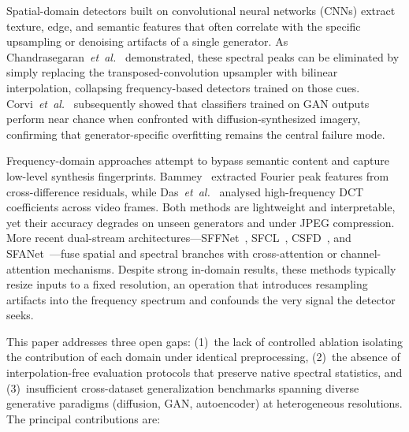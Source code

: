 \documentclass[conference]{IEEEtran}
\begin{document}
Spatial-domain detectors built on convolutional neural networks (CNNs) extract texture, edge, and semantic features that often correlate with the specific upsampling or denoising artifacts of a single generator. As Chandrasegaran~\emph{et~al.}~\cite{chandrasegaran2021fourier} demonstrated, these spectral peaks can be eliminated by simply replacing the transposed-convolution upsampler with bilinear interpolation, collapsing frequency-based detectors trained on those cues. Corvi~\emph{et~al.}~\cite{corvi2023intriguing} subsequently showed that classifiers trained on GAN outputs perform near chance when confronted with diffusion-synthesized imagery, confirming that generator-specific overfitting remains the central failure mode.

Frequency-domain approaches attempt to bypass semantic content and capture low-level synthesis fingerprints. Bammey~\cite{bammey2023synthbuster} extracted Fourier peak features from cross-difference residuals, while Das~\emph{et~al.}~\cite{das2023dctfade} analysed high-frequency DCT coefficients across video frames. Both methods are lightweight and interpretable, yet their accuracy degrades on unseen generators and under JPEG compression. More recent dual-stream architectures---SFFNet~\cite{wang2025sffnet}, SFCL~\cite{qiao2025sfcl}, CSFD~\cite{li2025csfd}, and SFANet~\cite{guo2025sfanet}---fuse spatial and spectral branches with cross-attention or channel-attention mechanisms. Despite strong in-domain results, these methods typically resize inputs to a fixed resolution, an operation that introduces resampling artifacts into the frequency spectrum and confounds the very signal the detector seeks.

This paper addresses three open gaps: (1)~the lack of controlled ablation isolating the contribution of each domain under identical preprocessing, (2)~the absence of interpolation-free evaluation protocols that preserve native spectral statistics, and (3)~insufficient cross-dataset generalization benchmarks spanning diverse generative paradigms (diffusion, GAN, autoencoder) at heterogeneous resolutions. The principal contributions are:
\end{document}
